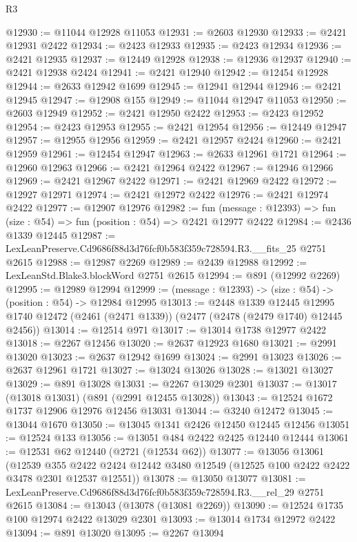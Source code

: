 \begin{lexlean}{R3}
\begin{coremodule}
@12930 := @11044 @12928 @11053
@12931 := @2603 @12930
@12933 := @2421 @12931 @2422
@12934 := @2423 @12933
@12935 := @2423 @12934
@12936 := @2421 @12935
@12937 := @12449 @12928
@12938 := @12936 @12937
@12940 := @2421 @12938 @2424
@12941 := @2421 @12940
@12942 := @12454 @12928
@12944 := @2633 @12942 @1699
@12945 := @12941 @12944
@12946 := @2421 @12945
@12947 := @12908 @155
@12949 := @11044 @12947 @11053
@12950 := @2603 @12949
@12952 := @2421 @12950 @2422
@12953 := @2423 @12952
@12954 := @2423 @12953
@12955 := @2421 @12954
@12956 := @12449 @12947
@12957 := @12955 @12956
@12959 := @2421 @12957 @2424
@12960 := @2421 @12959
@12961 := @12454 @12947
@12963 := @2633 @12961 @1721
@12964 := @12960 @12963
@12966 := @2421 @12964 @2422
@12967 := @12946 @12966
@12969 := @2421 @12967 @2422
@12971 := @2421 @12969 @2422
@12972 := @12927 @12971
@12974 := @2421 @12972 @2422
@12976 := @2421 @12974 @2422
@12977 := @12907 @12976
@12982 := fun (message : @12393) => fun (size : @54) => fun (position : @54) => @2421 @12977 @2422
@12984 := @2436 @1339 @12445
@12987 := LexLeanPreserve.Cd9686f88d3d76fcf0b583f359c728594.R3.__fits_25 @2751 @2615
@12988 := @12987 @2269
@12989 := @2439 @12988
@12992 := LexLeanStd.Blake3.blockWord @2751 @2615
@12994 := @891 (@12992 @2269)
@12995 := @12989 @12994
@12999 := (message : @12393) -> (size : @54) -> (position : @54) -> @12984 @12995
@13013 := @2448
    @1339
    @12445
    @12995
    @1740
    @12472
    (@2461 (@2471 @1339))
    (@2477 (@2478 (@2479 @1740) @12445 @2456))
@13014 := @12514 @971
@13017 := @13014 @1738 @12977 @2422
@13018 := @2267 @12456
@13020 := @2637 @12923 @1680
@13021 := @2991 @13020
@13023 := @2637 @12942 @1699
@13024 := @2991 @13023
@13026 := @2637 @12961 @1721
@13027 := @13024 @13026
@13028 := @13021 @13027
@13029 := @891 @13028
@13031 := @2267 @13029 @2301
@13037 := @13017 (@13018 @13031) (@891 (@2991 @12455 @13028))
@13043 := @12524 @1672 @1737 @12906 @12976 @12456 @13031
@13044 := @3240 @12472
@13045 := @13044 @1670
@13050 := @13045 @1341 @2426 @12450 @12445 @12456
@13051 := @12524 @133
@13056 := @13051 @484 @2422 @2425 @12440 @12444
@13061 := @12531 @62 @12440 (@2721 (@12534 @62))
@13077 := @13056
    @13061
    (@12539
      @355
      @2422
      @2424
      @12442
      @3480
      @12549
      (@12525 @100 @2422 @2422 @3478 @2301 @12537 @12551))
@13078 := @13050 @13077
@13081 := LexLeanPreserve.Cd9686f88d3d76fcf0b583f359c728594.R3.__rel_29 @2751 @2615
@13084 := @13043 (@13078 (@13081 @2269))
@13090 := @12524 @1735 @100 @12974 @2422 @13029 @2301
@13093 := @13014 @1734 @12972 @2422
@13094 := @891 @13020
@13095 := @2267 @13094

\end{coremodule}
\end{lexlean}
